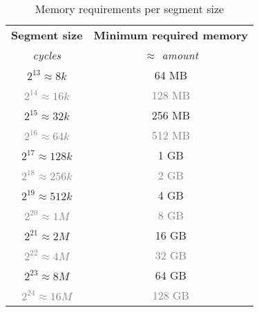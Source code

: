 \documentclass[a4paper, 10pt]{article}
\begin{document}
\begin{table}[h!]
  \begin{center}
    \footnotesize
    \label{tab:table1}
    \begin{tabular}{c|c}
	  \textbf{Segment size} & \textbf{Minimum required memory}\\
	  \textit{cycles} & \textit{$\approx$ amount}\\
	  \hline
	  $2^{13} \approx 8k$  & 64 MB\\
	  \textcolor{gray}{$2^{14} \approx 16k$} & \textcolor{gray}{128 MB}\\
      $2^{15} \approx 32k$ & 256 MB\\
      \textcolor{gray}{$2^{16} \approx 64k$} & \textcolor{gray}{512 MB}\\
      $2^{17} \approx 128k$ & 1 GB\\
      \textcolor{gray}{$2^{18} \approx 256k$} & \textcolor{gray}{2 GB}\\
      $2^{19} \approx 512k$ & 4 GB\\
      \textcolor{gray}{$2^{20} \approx 1M$} & \textcolor{gray}{8 GB}\\
      $2^{21} \approx 2M$ & 16 GB\\
      \textcolor{gray}{$2^{22} \approx 4M$} & \textcolor{gray}{32 GB}\\
      $2^{23} \approx 8M$ & 64 GB\\
      \textcolor{gray}{$2^{24} \approx 16M$} & \textcolor{gray}{128 GB}\\
    \end{tabular}
    \caption{Memory requirements per segment size}
  \end{center}
\end{table}
\end{document}
